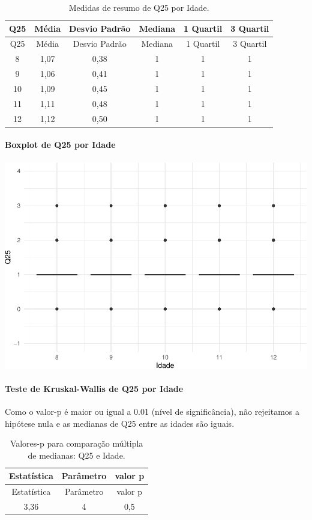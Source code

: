 \documentclass[]{article}
\let\oldparagraph\paragraph
\renewcommand{\paragraph}[1]{\oldparagraph{#1}\mbox{}}
\begin{document}
\begin{longtable}[]{@{}cccccc@{}}
\caption{\label{tab:unnamed-chunk-686}Medidas de resumo de Q25 por Idade.}\tabularnewline
\toprule
Q25 & Média & Desvio Padrão & Mediana & 1 Quartil & 3 Quartil\tabularnewline
\midrule
\endfirsthead
\toprule
Q25 & Média & Desvio Padrão & Mediana & 1 Quartil & 3 Quartil\tabularnewline
\midrule
\endhead
8 & 1,07 & 0,38 & 1 & 1 & 1\tabularnewline
9 & 1,06 & 0,41 & 1 & 1 & 1\tabularnewline
10 & 1,09 & 0,45 & 1 & 1 & 1\tabularnewline
11 & 1,11 & 0,48 & 1 & 1 & 1\tabularnewline
12 & 1,12 & 0,50 & 1 & 1 & 1\tabularnewline
\bottomrule
\end{longtable}

\hypertarget{boxplot-de-q25-por-idade}{%
\paragraph{Boxplot de Q25 por Idade}\label{boxplot-de-q25-por-idade}}

\begin{center}\includegraphics[width=0.75\linewidth]{relatorio_covid19_files/figure-latex/unnamed-chunk-687-1} \end{center}

\hypertarget{teste-de-kruskal-wallis-de-q25-por-idade}{%
\paragraph{Teste de Kruskal-Wallis de Q25 por Idade}\label{teste-de-kruskal-wallis-de-q25-por-idade}}

Como o valor-p é maior ou igual a 0.01 (nível de significância), não rejeitamos a hipótese nula e as medianas de Q25 entre as idades são iguais.

\begin{longtable}[]{@{}ccc@{}}
\caption{\label{tab:unnamed-chunk-689}Valores-p para comparação múltipla de medianas: Q25 e Idade.}\tabularnewline
\toprule
Estatística & Parâmetro & valor p\tabularnewline
\midrule
\endfirsthead
\toprule
Estatística & Parâmetro & valor p\tabularnewline
\midrule
\endhead
3,36 & 4 & 0,5\tabularnewline
\bottomrule
\end{longtable}
\end{document}
